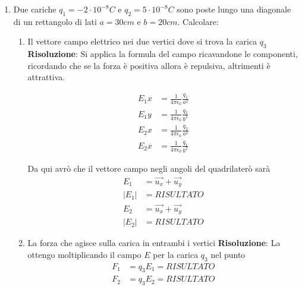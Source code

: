 \documentclass{article}
\begin{document}
\begin{enumerate}
\begin{enumerate}
    \end{enumerate}

    \item Due cariche $q_1 = -2 \cdot 10^{-8} C$ e $q_2 = 5 \cdot 10^{-8} C$ sono poste lungo una diagonale di un
    rettangolo di lati $a = 30cm$ e $b = 20cm$. Calcolare:

    \begin{enumerate}
        
        \item Il vettore campo elettrico nei due vertici dove si trova la carica $q_3$
        \newline 
        \textbf{Risoluzione}: Si applica la formula del campo ricavandone le componenti, ricordando che se la forza è positiva allora è repulsiva, altrimenti è attrattiva.
        
        \begin{align*}
            E_1x & = \frac{1}{4 \pi \epsilon_0} \frac{q_1}{a^2} \\
            E_1y & = \frac{1}{4 \pi \epsilon_0} \frac{q_2}{b^2} \\
            E_2x & = \frac{1}{4 \pi \epsilon_0} \frac{q_2}{a^2} \\
            E_2x & = \frac{1}{4 \pi \epsilon_0} \frac{q_1}{b^2}
        \end{align*}

        Da qui avrò che il vettore campo negli angoli del quadrilaterò sarà 
        \begin{align*}
            E_1 & = \vec{u_x} + \vec{u_y} \\
            |E_1| & = RISULTATO \\
            E_2 & = \vec{u_x} + \vec{u_y} \\
            |E_2| & = RISULTATO
        \end{align*}



        \item La forza che agisce sulla carica in entrambi i vertici
        \newline 
        \textbf{Risoluzione}: La ottengo moltiplicando il campo $E$ per la carica $q_3$ nel punto
        \begin{align*}
            F_1 & = q_3E_1 = RISULTATO \\
            F_2 & = q_3E_2 = RISULTATO
        \end{align*}


\end{enumerate}
\end{enumerate}
\end{document}
